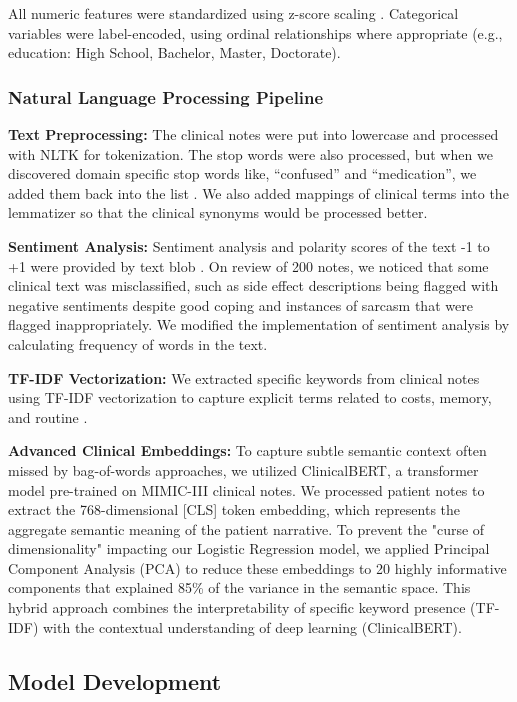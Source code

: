 \documentclass{article}
\begin{document}
All numeric features were standardized using z-score scaling \cite{naik2025}. Categorical variables were label-encoded, using ordinal relationships where appropriate (e.g., education: High School, Bachelor, Master, Doctorate).

\subsubsection{Natural Language Processing Pipeline}\label{subsubsec:nlp}

\textbf{Text Preprocessing:} The clinical notes were put into lowercase and processed with NLTK for tokenization. The stop words were also processed, but when we discovered domain specific stop words like, ``confused'' and ``medication'', we added them back into the list \cite{vanbulck2024}. We also added mappings of clinical terms into the lemmatizer so that the clinical synonyms would be processed better.

\textbf{Sentiment Analysis:} Sentiment analysis and polarity scores of the text -1 to +1 were provided by text blob \cite{villanueva2025}. On review of 200 notes, we noticed that some clinical text was misclassified, such as side effect descriptions being flagged with negative sentiments despite good coping and instances of sarcasm that were flagged inappropriately. We modified the implementation of sentiment analysis by calculating frequency of words in the text. 

\textbf{TF-IDF Vectorization:} We extracted specific keywords from clinical notes using TF-IDF vectorization to capture explicit terms related to costs, memory, and routine \cite{garg2023}. 

\textbf{Advanced Clinical Embeddings:} To capture subtle semantic context often missed by bag-of-words approaches, we utilized ClinicalBERT, a transformer model pre-trained on MIMIC-III clinical notes. We processed patient notes to extract the 768-dimensional [CLS] token embedding, which represents the aggregate semantic meaning of the patient narrative. To prevent the "curse of dimensionality" impacting our Logistic Regression model, we applied Principal Component Analysis (PCA) to reduce these embeddings to 20 highly informative components that explained 85\% of the variance in the semantic space. This hybrid approach combines the interpretability of specific keyword presence (TF-IDF) with the contextual understanding of deep learning (ClinicalBERT).

\subsection{Model Development}\label{subsec:model}
\end{document}
